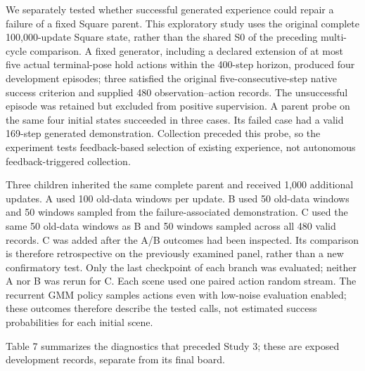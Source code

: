 \documentclass[10pt,letterpaper]{article}
\begin{document}
We separately tested whether successful generated experience could
repair a failure of a fixed Square parent. This exploratory study uses
the original complete 100,000-update Square state, rather than the
shared S0 of the preceding multi-cycle comparison. A fixed generator,
including a declared extension of at most five actual terminal-pose hold
actions within the 400-step horizon, produced four development episodes;
three satisfied the original five-consecutive-step native success
criterion and supplied 480 observation--action records. The unsuccessful
episode was retained but excluded from positive supervision. A parent
probe on the same four initial states succeeded in three cases. Its
failed case had a valid 169-step generated demonstration. Collection
preceded this probe, so the experiment tests feedback-based selection of
existing experience, not autonomous feedback-triggered collection.

Three children inherited the same complete parent and received 1,000
additional updates. A used 100 old-data windows per update. B used 50
old-data windows and 50 windows sampled from the failure-associated
demonstration. C used the same 50 old-data windows as B and 50 windows
sampled across all 480 valid records. C was added after the A/B outcomes
had been inspected. Its comparison is therefore retrospective on the
previously examined panel, rather than a new confirmatory test. Only the
last checkpoint of each branch was evaluated; neither A nor B was rerun
for C. Each scene used one paired action random stream. The recurrent
GMM policy samples actions even with low-noise evaluation enabled; these
outcomes therefore describe the tested calls, not estimated success
probabilities for each initial scene.

Table 7 summarizes the diagnostics that preceded Study 3; these are
exposed development records, separate from its final board.
\end{document}
